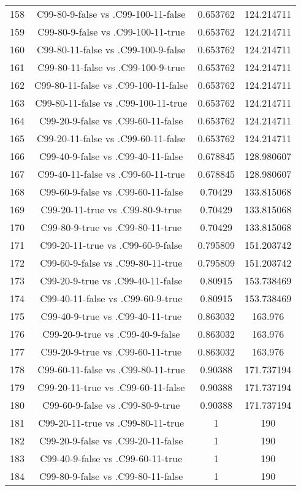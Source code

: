 \documentclass[a4paper,10pt]{article}
\begin{document}
\begin{landscape}
\begin{table}[!htp]
\begin{tabular}{cccc}
158&C99-80-9-false vs .C99-100-11-false&0.653762&124.214711\\
159&C99-80-9-false vs .C99-100-11-true&0.653762&124.214711\\
160&C99-80-11-false vs .C99-100-9-false&0.653762&124.214711\\
161&C99-80-11-false vs .C99-100-9-true&0.653762&124.214711\\
162&C99-80-11-false vs .C99-100-11-false&0.653762&124.214711\\
163&C99-80-11-false vs .C99-100-11-true&0.653762&124.214711\\
164&C99-20-9-false vs .C99-60-11-false&0.653762&124.214711\\
165&C99-20-11-false vs .C99-60-11-false&0.653762&124.214711\\
166&C99-40-9-false vs .C99-40-11-false&0.678845&128.980607\\
167&C99-40-11-false vs .C99-60-11-true&0.678845&128.980607\\
168&C99-60-9-false vs .C99-60-11-false&0.70429&133.815068\\
169&C99-20-11-true vs .C99-80-9-true&0.70429&133.815068\\
170&C99-80-9-true vs .C99-80-11-true&0.70429&133.815068\\
171&C99-20-11-true vs .C99-60-9-false&0.795809&151.203742\\
172&C99-60-9-false vs .C99-80-11-true&0.795809&151.203742\\
173&C99-20-9-true vs .C99-40-11-false&0.80915&153.738469\\
174&C99-40-11-false vs .C99-60-9-true&0.80915&153.738469\\
175&C99-40-9-true vs .C99-40-11-true&0.863032&163.976\\
176&C99-20-9-true vs .C99-40-9-false&0.863032&163.976\\
177&C99-20-9-true vs .C99-60-11-true&0.863032&163.976\\
178&C99-60-11-false vs .C99-80-11-true&0.90388&171.737194\\
179&C99-20-11-true vs .C99-60-11-false&0.90388&171.737194\\
180&C99-60-9-false vs .C99-80-9-true&0.90388&171.737194\\
181&C99-20-11-true vs .C99-80-11-true&1&190\\
182&C99-20-9-false vs .C99-20-11-false&1&190\\
183&C99-40-9-false vs .C99-60-11-true&1&190\\
184&C99-80-9-false vs .C99-80-11-false&1&190\\

\end{tabular}
\end{table}
\end{landscape}
\end{document}
